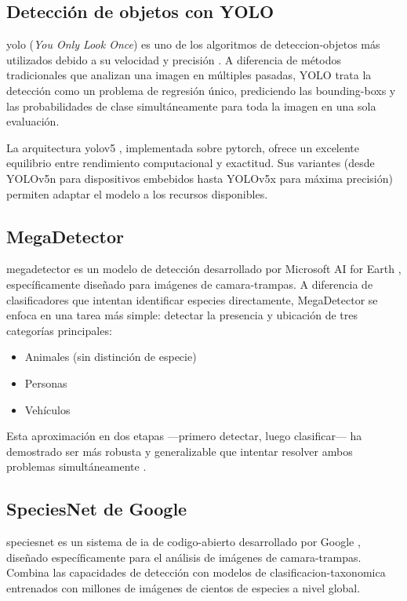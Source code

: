\documentclass[a4paper, 12pt]{report}
\begin{document}
\subsection{Detección de objetos con YOLO}

\gls{yolo} (\textit{You Only Look Once}) es uno de los algoritmos de
\gls{deteccion-objetos} más utilizados debido a su velocidad y precisión
\cite{redmon2016yolo}. A diferencia de métodos tradicionales que analizan una
imagen en múltiples pasadas, YOLO trata la detección como un problema de
regresión único, prediciendo las \glspl{bounding-box} y las probabilidades
de clase simultáneamente para toda la imagen en una sola evaluación.

La arquitectura \gls{yolov5} \cite{jocher2020yolov5}, implementada sobre
\gls{pytorch}, ofrece un excelente equilibrio entre rendimiento computacional
y exactitud. Sus variantes (desde YOLOv5n para dispositivos embebidos hasta
YOLOv5x para máxima precisión) permiten adaptar el modelo a los recursos
disponibles.

\subsection{MegaDetector}

\gls{megadetector} es un modelo de detección desarrollado por Microsoft AI
for Earth \cite{beery2019megadetector}, específicamente diseñado para imágenes
de \glspl{camara-trampa}. A diferencia de clasificadores que intentan
identificar especies directamente, MegaDetector se enfoca en una tarea más
simple: detectar la presencia y ubicación de tres categorías principales:

\begin{itemize}
  \item Animales (sin distinción de especie)
  \item Personas
  \item Vehículos
\end{itemize}

Esta aproximación en dos etapas ---primero detectar, luego clasificar--- ha
demostrado ser más robusta y generalizable que intentar resolver ambos
problemas simultáneamente \cite{velez2022platforms}.

\subsection{SpeciesNet de Google}

\gls{speciesnet} es un sistema de \gls{ia} de \gls{codigo-abierto} desarrollado
por Google \cite{gadot2024crop}, diseñado específicamente para el análisis de
imágenes de \glspl{camara-trampa}. Combina las capacidades de detección con
modelos de \gls{clasificacion-taxonomica} entrenados con millones de imágenes
de cientos de especies a nivel global.
\end{document}
